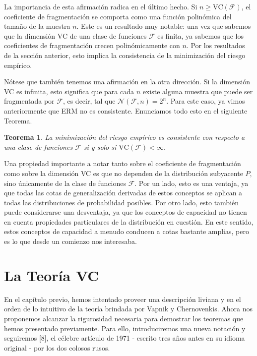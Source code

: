 \documentclass{report}
\newtheorem{thm}{Teorema}[section]
\begin{document}
La importancia de esta afirmación radica en el último hecho. Si \( n \geq \text{VC}(\mathcal{F}) \), 
el coeficiente de fragmentación se comporta como una función polinómica del tamaño de la muestra \( n \). 
Este es un resultado muy notable: una vez que sabemos que la dimensión VC de una clase de funciones 
\(\mathcal{F}\) es finita, ya sabemos que los coeficientes de fragmentación crecen polinómicamente con \( n \). 
Por los resultados de la sección anterior, esto implica la consistencia de la minimización del riesgo empírico.\newline

Nótese que también tenemos una afirmación en la otra dirección. Si la dimensión VC es infinita, esto significa 
que para cada \( n \) existe alguna muestra que puede ser fragmentada por \(\mathcal{F}\), es decir, tal que
\(\mathcal{N}(\mathcal{F}, n) = 2^n. \) Para este caso, ya vimos anteriormente que ERM no es consistente.
Enunciamos todo esto en el siguiente Teorema.\newline

\begin{thm}
    La minimización del riesgo empírico es consistente con respecto a una clase de funciones \(\mathcal{F}\) si y solo si
    \(\text{VC}(\mathcal{F}) < \infty\).\newline 
\end{thm}

Una propiedad importante a notar tanto sobre el coeficiente de fragmentación como sobre la 
dimensión VC es que no dependen de la distribución subyacente \( P \), sino únicamente de la 
clase de funciones \(\mathcal{F}\). Por un lado, esto es una ventaja, ya que todas las cotas de 
generalización derivadas de estos conceptos se aplican a todas las distribuciones de probabilidad 
posibles. Por otro lado, esto también puede considerarse una desventaja, ya que los conceptos de 
capacidad no tienen en cuenta propiedades particulares de la distribución en cuestión. En este 
sentido, estos conceptos de capacidad a menudo conducen a cotas bastante amplias, pero es lo que desde
un comienzo nos interesaba.\newline


\chapter{La Teoría VC}

En el capítulo previo, hemos intentado proveer una descripción liviana y en el orden de lo intuitivo de la teoría brindada por 
Vapnik y Chernovenkis. Ahora nos proponemos alcanzar la rigurosidad necesaria para demostrar los teoremas que hemos presentado 
previamente. Para ello, introduciremos una nueva notación y seguiremos [8], el célebre artículo de 1971 - escrito tres años antes en su 
idioma original - por los dos colosos rusos.\newline
\end{document}
